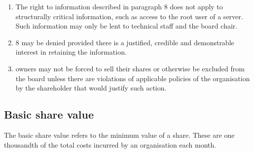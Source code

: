 \documentclass{article}
\begin{document}
\begin{enumerate}[(1)]
	\item The right to information described in paragraph 8 does not apply to structurally critical information, such as access to the root user of a server. Such information may only be lent to technical staff and the board chair.
	\item 8 may be denied provided there is a justified, credible and demonstrable interest in retaining the information.
	\item owners may not be forced to sell their shares or otherwise be excluded from the board unless there are violations of applicable policies of the organisation by the shareholder that would justify such action.
\end{enumerate}

\subsection{Basic share value}
The basic share value refers to the minimum value of a share. These are one thousandth of the total costs incurred by an organisation each month.
\end{document}
